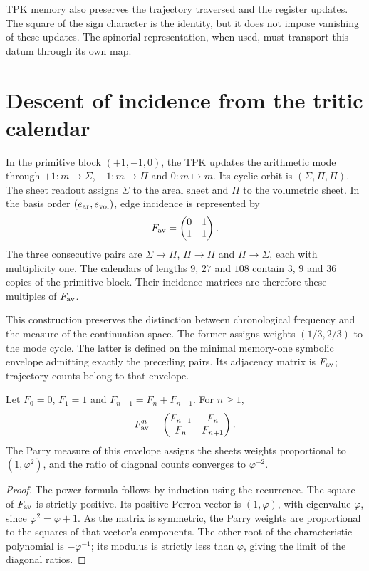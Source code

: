 TPK memory also preserves the trajectory traversed and the register
updates. The square of the sign character is the identity, but it does not impose
vanishing of these updates. The spinorial representation, when
used, must transport this datum through its own map.

\section{Descent of incidence from the tritic calendar}

In the primitive block $(+1,-1,0)$, the TPK updates the arithmetic mode through
$+1:m\mapsto\Sigma$, $-1:m\mapsto\Pi$ and $0:m\mapsto m$. Its cyclic orbit
is $(\Sigma,\Pi,\Pi)$. The sheet readout assigns $\Sigma$ to the areal sheet and
$\Pi$ to the volumetric sheet. In the basis order $(e_{\rm ar},e_{\rm vol})$,
edge incidence is represented by
\begin{equation}
 F_{\rm av}=\begin{pmatrix}0&1\\1&1\end{pmatrix}.
 \label{x_reciprocidad:iii:eq:fav}
\end{equation}
The three consecutive pairs are $\Sigma\to\Pi$, $\Pi\to\Pi$ and
$\Pi\to\Sigma$, each with multiplicity one. The calendars of lengths
$9$, $27$ and $108$ contain $3$, $9$ and $36$ copies of the primitive block.
Their incidence matrices are therefore these multiples of $F_{\rm av}$.

This construction preserves the distinction between chronological frequency and the measure
of the continuation space. The former assigns weights $(1/3,2/3)$ to the mode
cycle. The latter is defined on the minimal memory-one symbolic envelope
admitting exactly the preceding pairs. Its adjacency matrix is
$F_{\rm av}$; trajectory counts belong to that envelope.

\begin{proposition}
Let $F_0=0$, $F_1=1$ and $F_{n+1}=F_n+F_{n-1}$. For $n\geq1$,
\begin{equation}
 F_{\rm av}^{n}=
 \begin{pmatrix}F_{n-1}&F_n\\F_n&F_{n+1}\end{pmatrix}.
 \label{x_reciprocidad:iii:eq:fav-powers}
\end{equation}
The Parry measure of this envelope assigns the sheets weights proportional
to $(1,\varphi^2)$, and the ratio of diagonal counts converges to $\varphi^{-2}$.
\end{proposition}
\begin{proof}
The power formula follows by induction using the recurrence.
The square of $F_{\rm av}$ is strictly positive. Its positive Perron
vector is $(1,\varphi)$, with eigenvalue $\varphi$, since
$\varphi^2=\varphi+1$. As the matrix is symmetric, the Parry weights are
proportional to the squares of that vector's components. The other root
of the characteristic polynomial is $-\varphi^{-1}$; its modulus is strictly
less than $\varphi$, giving the limit of the diagonal ratios.
\end{proof}

